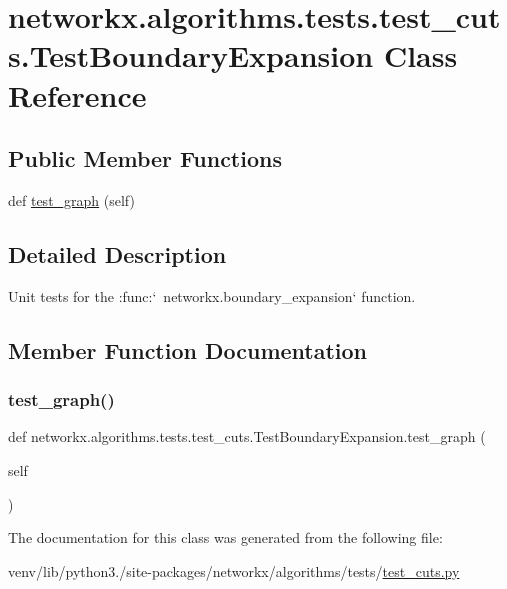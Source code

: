 \hypertarget{classnetworkx_1_1algorithms_1_1tests_1_1test__cuts_1_1TestBoundaryExpansion}{}\section{networkx.\+algorithms.\+tests.\+test\+\_\+cuts.\+Test\+Boundary\+Expansion Class Reference}
\label{classnetworkx_1_1algorithms_1_1tests_1_1test__cuts_1_1TestBoundaryExpansion}
\subsection*{Public Member Functions}
\begin{DoxyCompactItemize}
\item 
def \hyperlink{classnetworkx_1_1algorithms_1_1tests_1_1test__cuts_1_1TestBoundaryExpansion_a958d5a434aa87927b880940cac46eeeb}{test\+\_\+graph} (self)
\end{DoxyCompactItemize}


\subsection{Detailed Description}
\begin{DoxyVerb}Unit tests for the :func:`~networkx.boundary_expansion` function.\end{DoxyVerb}
 

\subsection{Member Function Documentation}
\mbox{\label{classnetworkx_1_1algorithms_1_1tests_1_1test__cuts_1_1TestBoundaryExpansion_a958d5a434aa87927b880940cac46eeeb}} 
\subsubsection{\texorpdfstring{test\+\_\+graph()}{test\_graph()}}
{\footnotesize\ttfamily def networkx.\+algorithms.\+tests.\+test\+\_\+cuts.\+Test\+Boundary\+Expansion.\+test\+\_\+graph (\begin{DoxyParamCaption}\item[{}]{self }\end{DoxyParamCaption})}



The documentation for this class was generated from the following file\+:\begin{DoxyCompactItemize}
\item 
venv/lib/python3./site-\/packages/networkx/algorithms/tests/\hyperlink{tests_2test__cuts_8py}{test\+\_\+cuts.\+py}\end{DoxyCompactItemize}
